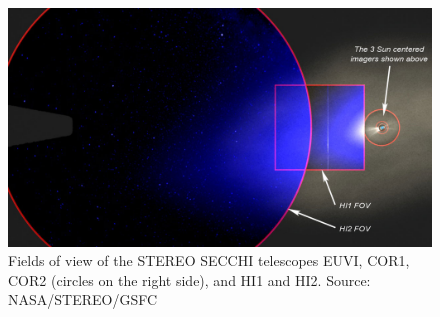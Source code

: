 \begin{figure}
    \centering
    \includegraphics[width=0.8\linewidth]{images/secchi_fov}
    \caption[Fields of view of the \acs{STEREO} SECCHI telescopes]{Fields of view of the \ac{STEREO} SECCHI telescopes EUVI, COR1, COR2 (circles on the right side), and HI1 and HI2. Source: NASA/STEREO/GSFC}
    \label{fig:secchifov}
\end{figure}
